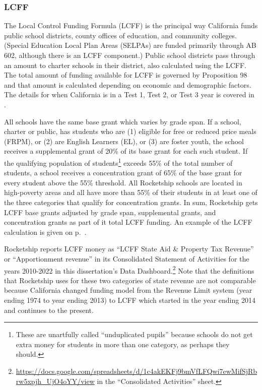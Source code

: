\newpage
\subsubsection{LCFF}%
\label{sec:lcff}\indent%

The Local Control Funding Formula (LCFF) is the principal way California funds public school districts, county offices of education, and community colleges. (Special Education Local Plan Areas (SELPAs) are funded primarily through AB 602, although there is an LCFF component.) Public school districts pass through an amount to charter schools in their district, also calculated using the LCFF. The total amount of funding available for LCFF is governed by Proposition 98 and that amount is calculated depending on economic and demographic factors. The details for when California is in a Test 1, Test 2, or Test 3 year is covered in \textcite[17–21]{Aguinaldo.etal2023}.

All schools have the same base grant which varies by grade span. If a school, charter or public, has students who are (1) eligible for free or reduced price meals (FRPM), or (2) are English Learners (EL), or (3) are foster youth, the school receives a supplemental grant of 20\% of its base grant for each such student. If the qualifying population of students\footnote{These are unartfully called ``unduplicated pupils'' because schools do not get extra money for students in more than one category, as perhaps they should.} exceeds 55\% of the total number of students, a school receives a concentration grant of 65\% of the base grant for every student above the 55\% threshold. All Rocketship schools are located in high-poverty areas and all have more than 55\% of their students in at least one of the three categories that qualify for concentration grants. In sum, Rocketship gets LCFF base grants adjusted by grade span, supplemental grants, and concentration grants as part of it total LCFF funding. An example of the LCFF calculation is given on p.~\pageref{example_LCFF_calculation}.

Rocketship reports LCFF money as ``LCFF State Aid \& Property Tax Revenue'' or ``Apportionment revenue'' in its Consolidated Statement of Activities for the years 2010-2022 in this dissertation's Data Dashboard.\footnote{\url{https://docs.google.com/spreadsheets/d/1c4akEKFj9bmVfLFQwi7ewMifSjRbrw5xpjh_UjO4oYY/view} in the ``Consolidated Activities'' sheet.} Note that the definitions that Rocketship uses for these two categories of state revenue are not comparable because California changed funding model from the Revenue Limit system (year ending 1974 to year ending 2013) to LCFF which started in the year ending 2014 and continues to the present.

